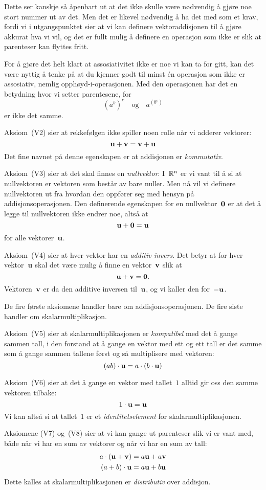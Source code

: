 Dette ser kanskje så åpenbart ut at det ikke skulle være nødvendig å
gjøre noe stort nummer ut av det.  Men det er likevel nødvendig å ha
det med som et krav, fordi vi i utgangspunktet sier at vi kan definere
vektoraddisjonen til å gjøre akkurat hva vi vil, og det er fullt mulig
å definere en operasjon som ikke er slik at parenteser kan flyttes
fritt.

For å gjøre det helt klart at assosiativitet ikke er noe vi kan ta for
gitt, kan det være nyttig å tenke på at du kjenner godt til minst én
operasjon som ikke er assosiativ, nemlig opphøyd-i-operasjonen.  Med
den operasjonen har det en betydning hvor vi setter parentesene, for
\[
(a^b)^c
\quad\text{og}\quad
a^{(b^c)}
\]
er ikke det samme.

Aksiom~(V2) sier at rekkefølgen ikke spiller noen rolle når vi adderer
vektorer:
\[
\mathbf{u} + \mathbf{v} = \mathbf{v} + \mathbf{u}
\]
Det fine navnet på denne egenskapen er at addisjonen er
\emph{kommutativ}.

Aksiom~(V3) sier at det skal finnes en \emph{nullvektor}.  I~$\mathbb{R}^n$ er
vi vant til å si at nullvektoren er vektoren som består av bare
nuller.  Men nå vil vi definere nullvektoren ut fra hvordan den
oppfører seg med hensyn på addisjonsoperasjonen.  Den definerende
egenskapen for en nullvektor~$\mathbf{0}$ er at det å legge til nullvektoren
ikke endrer noe, altså at
\[
\mathbf{u} + \mathbf{0} = \mathbf{u}
\]
for alle vektorer~$\mathbf{u}$.

Aksiom~(V4) sier at hver vektor har en \emph{additiv invers}.  Det
betyr at for hver vektor~$\mathbf{u}$ skal det være mulig å finne en
vektor~$\mathbf{v}$ slik at
\[
\mathbf{u} + \mathbf{v} = \mathbf{0}.
\]
Vektoren~$\mathbf{v}$ er da den additive inversen til~$\mathbf{u}$, og vi kaller den
for~$-\mathbf{u}$.

De fire første aksiomene handler bare om addisjonsoperasjonen.  De
fire siste handler om skalarmultiplikasjon.

Aksiom~(V5) sier at skalarmultiplikasjonen er \emph{kompatibel} med
det å gange sammen tall, i den forstand at å gange en vektor med ett
og ett tall er det samme som å gange sammen tallene først og så
multiplisere med vektoren:
\[
(ab) \cdot \mathbf{u} = a \cdot (b \cdot \mathbf{u})
\]

Aksiom~(V6) sier at det å gange en vektor med tallet~$1$ alltid gir
oss den samme vektoren tilbake:
\[
1 \cdot \mathbf{u} = \mathbf{u}
\]
Vi kan altså si at tallet~$1$ er et \emph{identitetselement} for
skalarmultiplikasjonen.

Aksiomene (V7) og~(V8) sier at vi kan gange ut parenteser slik vi er
vant med, både når vi har en sum av vektorer og når vi har en sum av
tall:
\begin{align*}
a \cdot (\mathbf{u} + \mathbf{v}) &= a \mathbf{u} + a \mathbf{v} \\
(a + b) \cdot \mathbf{u}  &= a \mathbf{u} + b \mathbf{u}
\end{align*}
Dette kalles at skalarmultiplikasjonen er \emph{distributiv} over
addisjon.

